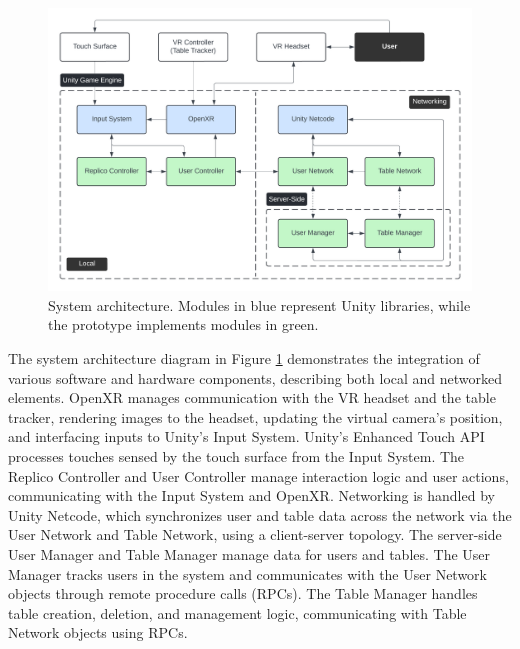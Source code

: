     \begin{figure}[h]
        \centering
        \includegraphics[width=.97\linewidth]{figures/architecture.png}
        \caption{System architecture. Modules in blue represent Unity libraries, while the prototype implements modules in green.}
        \label{fig:architecture}
    \end{figure}
    
    The system architecture diagram in Figure \ref{fig:architecture} demonstrates the integration of various software and hardware components, describing both local and networked elements. OpenXR manages communication with the VR headset and the table tracker, rendering images to the headset, updating the virtual camera's position, and interfacing inputs to Unity's Input System. Unity's Enhanced Touch API processes touches sensed by the touch surface from the Input System. The Replico Controller and User Controller manage interaction logic and user actions, communicating with the Input System and OpenXR. Networking is handled by Unity Netcode, which synchronizes user and table data across the network via the User Network and Table Network, using a client-server topology. The server-side User Manager and Table Manager manage data for users and tables. The User Manager tracks users in the system and communicates with the User Network objects through remote procedure calls (RPCs). The Table Manager handles table creation, deletion, and management logic, communicating with Table Network objects using RPCs.




